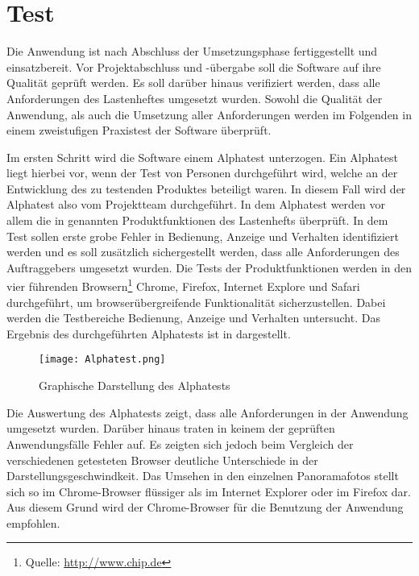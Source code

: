 \section{Test}
\label{sec:Test}

Die Anwendung ist nach Abschluss der Umsetzungsphase fertiggestellt und
einsatzbereit. Vor Projektabschluss und -übergabe soll die Software auf ihre
Qualität geprüft werden. Es soll darüber hinaus verifiziert werden, dass alle
Anforderungen des Lastenheftes umgesetzt wurden. Sowohl die Qualität der
Anwendung, als auch die Umsetzung aller Anforderungen werden im Folgenden in
einem zweistufigen Praxistest der Software überprüft.

Im ersten Schritt wird die Software einem Alphatest unterzogen. Ein Alphatest
liegt hierbei vor, wenn der Test von Personen durchgeführt wird, welche an
der Entwicklung des zu testenden Produktes beteiligt waren. In diesem Fall
wird der Alphatest also vom Projektteam durchgeführt. In dem Alphatest werden
vor allem die in  genannten Produktfunktionen des
Lastenhefts überprüft. In dem Test sollen erste grobe Fehler in Bedienung,
Anzeige und Verhalten identifiziert werden und es soll zusätzlich sichergestellt
werden, dass alle Anforderungen des Auftraggebers umgesetzt wurden. Die Tests
der Produktfunktionen werden in den vier führenden Browsern\footnote{Quelle:
\url{http://www.chip.de}} Chrome, Firefox, Internet Explore und Safari
durchgeführt, um browserübergreifende Funktionalität sicherzustellen.
Dabei werden die Testbereiche Bedienung, Anzeige und Verhalten untersucht. Das
Ergebnis des durchgeführten Alphatests ist in  dargestellt.

\begin{figure}[htb]
\centering
\texttt{[image: Alphatest.png]}
\caption[Graphische Darstellung des Alphatests]{Graphische Darstellung des Alphatests\protect\footnotemark}
\label{fig:Alphatest}
\end{figure}

Die Auswertung des Alphatests zeigt, dass alle Anforderungen in der
Anwendung umgesetzt wurden. Darüber hinaus traten in keinem der geprüften
Anwendungsfälle Fehler auf. Es zeigten sich jedoch beim Vergleich der
verschiedenen getesteten Browser deutliche Unterschiede in der
Darstellungsgeschwindkeit. Das Umsehen in den einzelnen Panoramafotos stellt
sich so im Chrome-Browser flüssiger als im Internet Explorer oder im
Firefox dar. Aus diesem Grund wird der Chrome-Browser für die Benutzung der
Anwendung empfohlen.

